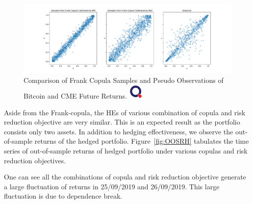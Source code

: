 \begin{figure}[th]
   \centering
   \includegraphics[width=\textwidth]{_pics/Frank.pdf}
   \caption{Comparison of Frank Copula Samples and Pseudo Observations of Bitcoin and CME Future Returns.
   \href{http://www.quantlet.com/}{\includegraphics[width=20pt]{_pics/qletlogo_tr.png}}}
   \label{fig:Frank}
\end{figure} \medskip

Aside from the Frank-copula, the HEs of various combination of copula and risk reduction objective are very similar.
This is an expected result as the portfolio consists only two assets.
In addition to hedging effectiveness, we observe the out-of-sample returns of the hedged portfolio.
Figure~\ref{fig:OOSRH} tabulates the time series of out-of-sample returns of hedged portfolio under various copulas and risk reduction objectives. \medskip

One can see all the combinations of copula and risk reduction objective generate a large fluctuation of returns in
25/09/2019 and 26/09/2019.
This large fluctuation is due to dependence break.
\medskip

